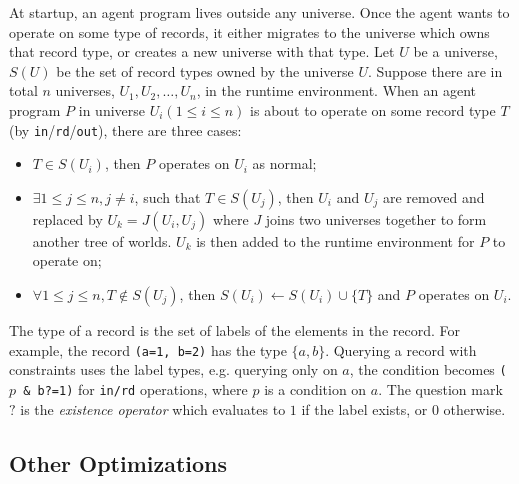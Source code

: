 \documentclass[preprint,10pt]{sigplanconf}
\newcommand{\monospace}[1]{\texttt{\small #1}}
\newcommand{\ry}[1]{\textcolor{red}{[RY: #1]}}
\begin{document}
At startup, an agent program lives outside any universe. 
Once the agent wants to operate on some type of records, 
it either migrates to the universe 
which owns that record type, or creates a new universe with that type. 
Let $U$ be a universe, $S(U)$ be the set of record types owned by 
the universe $U$. Suppose there are in total $n$ universes, 
$U_1,U_2,\dots,U_n$, in the runtime environment. 
When an agent program $P$ in universe $U_i (1\leq i\leq n)$ 
is about to operate on some record type $T$ 
(by \monospace{in}/\monospace{rd}/\monospace{out}), 
there are three cases: 
  \begin{itemize}
    \item $T \in S(U_i)$, then $P$ operates on $U_i$ as normal; 
    \item $\exists 1\leq j\leq n, j\neq i$, such that $T \in S(U_j)$, then 
          $U_i$ and $U_j$ are removed and replaced by $U_k=J(U_i,U_j)$ where 
          $J$ joins two universes together to form another tree of worlds. 
          $U_k$ is then added to the runtime environment for $P$ to operate on; 
    \item $\forall 1\leq j\leq n, T \not\in S(U_j)$, then 
          $S(U_i) \leftarrow S(U_i) \cup \{T\}$ and $P$ operates on $U_i$. 
  \end{itemize}

The type of a record is the set of labels of the elements in the record. 
For example, the record {\tt (a=1, b=2)} has the type $\{a, b\}$. 
Querying a record with constraints uses the label types,
e.g. querying 
only on $a$, the condition becomes {\tt ($p$ \& b?=1)} 
for {\tt in/rd} operations, where $p$ is a condition on $a$. 
The question mark $?$ is the \emph{existence operator} which 
evaluates to $1$ if the label exists, or $0$ otherwise. 

\subsection{Other Optimizations}
\end{document}
